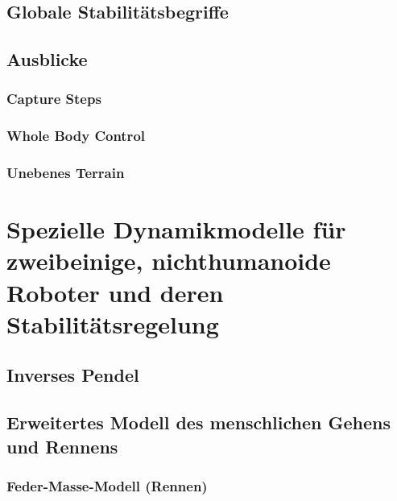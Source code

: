 \documentclass[a4paper, 11pt, accentcolor = tud3b]{tudreport}
\begin{document}
			\subsection{Globale Stabilitätsbegriffe} %

			\subsection{Ausblicke} %

				\subsubsection{Capture Steps} %

				\subsubsection{Whole Body Control} %

				\subsubsection{Unebenes Terrain} %

		\section{Spezielle Dynamikmodelle für zweibeinige, nichthumanoide Roboter und deren Stabilitätsregelung} %

			\subsection{Inverses Pendel} %

			\subsection{Erweitertes Modell des menschlichen Gehens und Rennens} %

				\subsubsection{Feder-Masse-Modell (Rennen)} %
\end{document}

